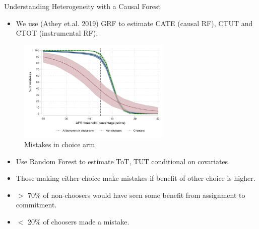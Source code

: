 \documentclass[8pt]{beamer}
\begin{document}
\begin{frame}{Understanding Heterogeneity with a Causal Forest}
\label{HTE}
\begin{itemize}

\item We use (Athey et.al. 2019) GRF to estimate CATE (causal RF), CTUT and CTOT (instrumental RF).
\end{itemize}
    
    
        \begin{figure}
        \caption{Mistakes in choice arm}
        \centering
        \includegraphics[width=0.65\textwidth]{Figuras/line_cw_apr_tot_tut.pdf}
        \end{figure}

\begin{itemize}
    \item   Use Random Forest to estimate ToT, TUT conditional on covariates.
    \item   Those making either choice make mistakes if benefit of other choice is higher.
    \item $>$ 70\% of non-choosers would have seen some benefit from assignment to commitment.
    \item  $<$ 20\% of choosers made a mistake.
\end{itemize}        


\end{frame}
\end{document}
